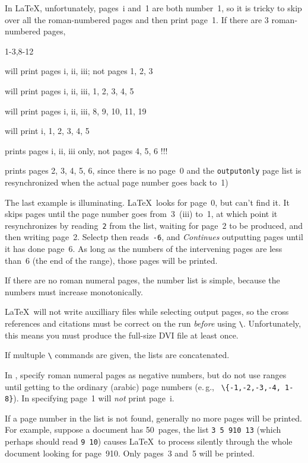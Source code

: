 \documentclass[pagesize=auto, fontsize=12pt]{scrartcl}
\makeatletter
\newcommand*{\cs}[1]{\texttt{\textbackslash#1}}
\newcommand*{\cmd}[1]{\cs{\expandafter\@gobble\string#1}}
\newcommand*{\outputonly}[1]{\cmd{\outputonly}\texttt{\{#1\}}}
\makeatother
\begin{document}
In \LaTeX, unfortunately, pages~i and~1 are both number~1, so it is
tricky to skip over all the roman-numbered pages and then print
page~1.  If there are 3 roman-numbered pages,
%
\begingroup
{}
\begin{labeling}{1-3,8-12}
\item[1-3]
  will print pages i, ii, iii; not pages 1, 2, 3
\item[1-3,1-5]
  will print pages i, ii, iii, 1, 2, 3, 4, 5
\item[1-3,8-12]
  will print pages i, ii, iii, 8, 9, 10, 11, 19
\item[1,1-5]
  will print i, 1, 2, 3, 4, 5
\item[1-6]
  prints pages i, ii, iii only, not pages 4, 5, 6  !!!
\item[0,2-6]
  prints pages 2, 3, 4, 5, 6, since there is no page~0 and the
  \verb|outputonly| page list is resynchronized when the actual page
  number goes back to~1)
\end{labeling}
\endgroup
%
The last example is illuminating.  \LaTeX\ looks for page~0, but can't find
it. It skips pages until the page number goes from~3~(iii) to~1, at which
point it resynchronizes by reading~\texttt{2} from the list, waiting for page~2
to be produced, and then writing page~2. Selectp then reads~\texttt{-6}, and
\emph{Continues} outputting pages until it has done page~6.  As long as the
numbers of the intervening pages are less than~6 (the end of the range),
those pages will be printed. 

If there are no roman numeral pages, the number list is simple, because
the numbers must increase monotonically.

\LaTeX\ will not write auxilliary files while selecting output pages, so
the cross references and citations must be correct on the run \emph{before} 
using \cmd{\outputonly}.  Unfortunately, this means you must produce the 
full-size DVI file at least once.

If multuple \cmd{\outputonly} commands are given, the lists are concatenated.

In , specify roman numeral pages as negative numbers, but do not
use ranges until getting to the ordinary (arabic) page numbers (e.\,g.,\ %
\outputonly{-1,-2,-3,-4, 1-8}).  In  specifying page~1 will \emph{not}
print page~i. 

If a page number in the list is not found, generally no more pages will be
printed. For example, suppose a document has 50~pages, the list \verb*|3 5 910 13|
(which perhaps should read \verb*|9 10|) causes \LaTeX\ to process silently
through the whole document looking for page~910.  Only pages~3 and~5 will
be printed. 
\end{document}
